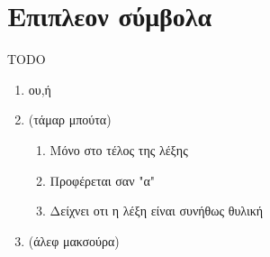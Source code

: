 \section*{Επιπλεον σύμβολα}
TODO
\begin{enumerate}
\item ου,ή
\item \ar{} (τάμαρ μπούτα)
	\begin{enumerate}
	\item Μόνο στο τέλος της λέξης
	\item Προφέρεται σαν "α"
	\item Δείχνει οτι η λέξη είναι συνήθως θυλική
	\end{enumerate}
\item (άλεφ μακσούρα)
\end{enumerate}
